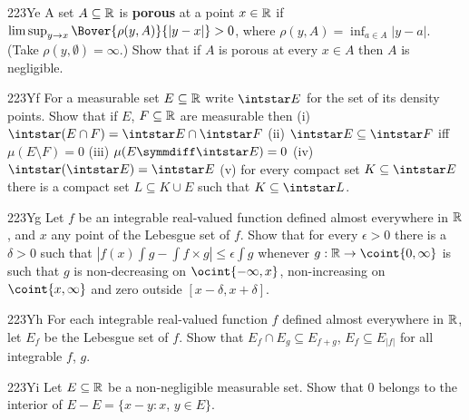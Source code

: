 {\spheader 223Ye A set $A\subseteq\Bbb R$ is {\bf porous} at a point
$x\in\Bbb R$ if $\limsup_{y\to x}\Bover{\rho(y,A)}{|y-x|}>0$, where
$\rho(y,A)=\inf_{a\in A}|y-a|$.   (Take $\rho(y,\emptyset)=\infty$.)
Show that if $A$ is porous at every $x\in A$ then $A$ is negligible.
     
\spheader 223Yf For a measurable set $E\subseteq\Bbb R$ write
$\intstar E$ for the set of its density points.   Show that if $E$, 
$F\subseteq\Bbb R$ are measurable then (i)
$\intstar(E\cap F)=\intstar E\cap\intstar F$ 
(ii) $\intstar E\subseteq\intstar F$
iff $\mu(E\setminus F)=0$ (iii) $\mu(E\symmdiff\intstar E)=0$ (iv)
$\intstar(\intstar E)=\intstar E$ (v) for
every compact set $K\subseteq\intstar E$ there is a compact set
$L\subseteq K\cup E$ such that $K\subseteq\intstar L$.
     
\spheader 223Yg Let $f$ be an integrable real-valued function defined
almost everywhere in $\Bbb R$, and $x$ any point of the Lebesgue set of
$f$.   Show that for every $\epsilon>0$ there is a $\delta>0$ such that
$|f(x)\int g-\int f\times g|\le\epsilon\int g$ whenever
$g:\Bbb R\to\coint{0,\infty}$ is such that $g$ is non-decreasing on
$\ocint{-\infty,x}$, non-increasing on $\coint{x,\infty}$ and zero
outside $[x-\delta,x+\delta]$.   

\spheader 223Yh For each integrable real-valued function $f$ defined almost
everywhere in $\Bbb R$, let $E_f$ be the Lebesgue set of $f$.   Show that
$E_f\cap E_g\subseteq E_{f+g}$, $E_f\subseteq E_{|f|}$ for all integrable
$f$, $g$.

\spheader 223Yi 
Let $E\subseteq\Bbb R$ be a non-negligible measurable set. 
Show that $0$ belongs to the interior of $E-E=\{x-y:x$, $y\in E\}$.
}%
     
     
\discrpage


